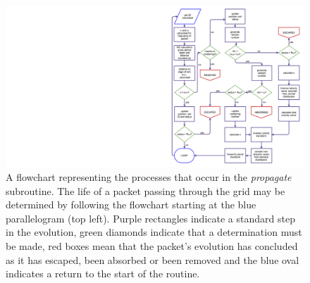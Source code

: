 		\begin{centering}
		\begin{figure}
		\includegraphics[scale=0.165, trim=1180mm -20mm 28mm -20mm]{chapters/chapter2/propagate_module.png}
		\caption[A flowchart representing the processes that occur in the \textit{propagate} subroutine]{A flowchart representing the processes that occur in the \textit{propagate} subroutine.  The life of a packet passing through the grid may be determined by following the flowchart starting at the blue parallelogram (top left).  Purple rectangles indicate a standard step in the evolution, green diamonds indicate that a determination must be made, red boxes mean that the packet's evolution has concluded as it has escaped, been absorbed or been removed and the blue oval indicates a return to the start of the routine.}
		\label{fig:flowchart_propagate}
		\end{figure}
		\end{centering}
		
